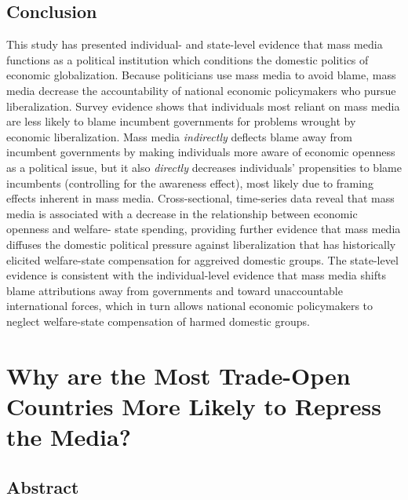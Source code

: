 \documentclass[12pt]{report}
\begin{document}
\section{Conclusion}

This study has presented individual- and state-level evidence that mass media functions as a
political institution which conditions the domestic politics of economic globalization. Because
politicians use mass media to avoid blame, mass media decrease the accountability of national
economic policymakers who pursue liberalization. Survey evidence shows that individuals most reliant
on mass media are less likely to blame incumbent governments for problems wrought by economic
liberalization. Mass media \emph{indirectly} deflects blame away from incumbent governments by
making individuals more aware of economic openness as a political issue, but it also \emph{directly}
decreases individuals' propensities to blame incumbents (controlling for the awareness effect), most
likely due to framing effects inherent in mass media. Cross-sectional, time-series data reveal that
mass media is associated with a decrease in the relationship between economic openness and welfare-
state spending, providing further evidence that mass media diffuses the domestic political pressure
against liberalization that has historically elicited welfare-state compensation for aggreived
domestic groups. The state-level evidence is consistent with the individual-level evidence that mass
media shifts blame attributions away from governments and toward unaccountable international forces,
which in turn allows national economic policymakers to neglect welfare-state compensation of harmed
domestic groups.


\chapter{Why are the Most Trade-Open Countries More Likely to Repress the Media?}

\section{Abstract}
\end{document}
